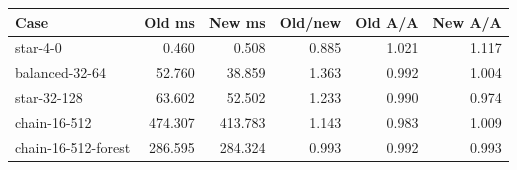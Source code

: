 \begin{center}\small
\begin{tabular}{lrrrrr}
\toprule
Case & Old ms & New ms & Old/new & Old A/A & New A/A \\
\midrule
star-4-0 & 0.460 & 0.508 & 0.885 & 1.021 & 1.117 \\
balanced-32-64 & 52.760 & 38.859 & 1.363 & 0.992 & 1.004 \\
star-32-128 & 63.602 & 52.502 & 1.233 & 0.990 & 0.974 \\
chain-16-512 & 474.307 & 413.783 & 1.143 & 0.983 & 1.009 \\
chain-16-512-forest & 286.595 & 284.324 & 0.993 & 0.992 & 0.993 \\
\bottomrule
\end{tabular}
\end{center}
